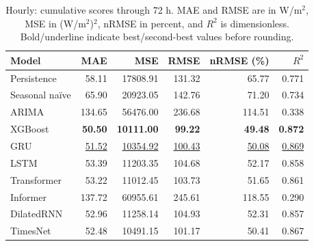 \begin{table}[!htbp]
\centering
\small
\setlength{\tabcolsep}{6pt}
\caption{Hourly: cumulative scores through 72 h. MAE and RMSE are in W/m$^2$, MSE in (W/m$^2$)$^2$, nRMSE in percent, and $R^2$ is dimensionless. Bold/underline indicate best/second-best values before rounding.}
\label{tab:baseline_hourly_72_extension_72}
\begin{tabular}{@{}lrrrrr@{}}
\toprule
Model & MAE & MSE & RMSE & nRMSE (\%) & $R^2$ \\
\midrule
Persistence & 58.11 & 17808.91 & 131.32 & 65.77 & 0.771 \\
Seasonal na\"ive & 65.90 & 20923.05 & 142.76 & 71.20 & 0.734 \\
ARIMA & 134.65 & 56476.00 & 236.68 & 114.51 & 0.338 \\
XGBoost & \textbf{50.50} & \textbf{10111.00} & \textbf{99.22} & \textbf{49.48} & \textbf{0.872} \\
GRU & \underline{51.52} & \underline{10354.92} & \underline{100.43} & \underline{50.08} & \underline{0.869} \\
LSTM & 53.39 & 11203.35 & 104.68 & 52.17 & 0.858 \\
Transformer & 53.22 & 11012.45 & 103.73 & 51.65 & 0.861 \\
Informer & 137.72 & 60955.61 & 245.61 & 118.55 & 0.290 \\
DilatedRNN & 52.96 & 11258.14 & 104.93 & 52.31 & 0.857 \\
TimesNet & 52.48 & 10491.15 & 101.17 & 50.41 & 0.867 \\
\bottomrule
\end{tabular}
\end{table}

